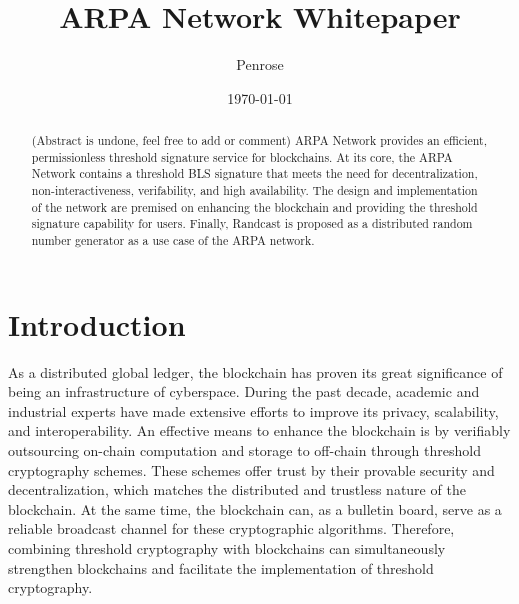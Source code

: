 \documentclass[11pt]{article}
\title{ARPA Network Whitepaper}
\author{Penrose}
\date{\today}
\begin{document}
\maketitle

\begin{abstract}
(Abstract is undone, feel free to add or comment) ARPA Network provides an efficient, permissionless threshold signature service for blockchains. At its core, the ARPA Network contains a threshold BLS signature that meets the need for decentralization, non-interactiveness, verifability, and high availability. The design and implementation of the network are premised on enhancing the blockchain and providing the threshold signature capability for users. Finally, Randcast is proposed as a distributed random number generator as a use case of the ARPA network. 

\end{abstract}

\section{Introduction}
As a distributed global ledger, the blockchain has proven its great significance of being an infrastructure of cyberspace. During the past decade, academic and industrial experts have made extensive efforts to improve its privacy, scalability, and interoperability. An effective means to enhance the blockchain is by verifiably outsourcing on-chain computation and storage to off-chain through threshold cryptography schemes. These schemes offer trust by their provable security and decentralization, which matches the distributed and trustless nature of the blockchain. At the same time, the blockchain can, as a bulletin board, serve as a reliable broadcast channel for these cryptographic algorithms. Therefore, combining threshold cryptography with blockchains can simultaneously strengthen blockchains and facilitate the implementation of threshold cryptography.
\end{document}
